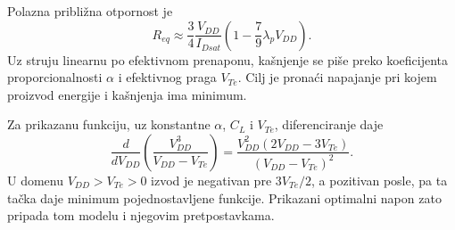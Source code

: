 Polazna približna otpornost je
\[R_{eq}\approx\frac34\frac{V_{DD}}{I_{Dsat}}\left(1-\frac79\lambda_pV_{DD}\right).\]
Uz struju linearnu po efektivnom prenaponu, kašnjenje se piše preko koeficijenta proporcionalnosti $\alpha$ i efektivnog praga $V_{Te}$. Cilj je pronaći napajanje pri kojem proizvod energije i kašnjenja ima minimum.

Za prikazanu funkciju, uz konstantne $\alpha$, $C_L$ i $V_{Te}$, diferenciranje daje
\[\frac{d}{dV_{DD}}\left(\frac{V_{DD}^3}{V_{DD}-V_{Te}}\right)=\frac{V_{DD}^2(2V_{DD}-3V_{Te})}{(V_{DD}-V_{Te})^2}.\]
U domenu $V_{DD}>V_{Te}>0$ izvod je negativan pre $3V_{Te}/2$, a pozitivan posle, pa ta tačka daje minimum pojednostavljene funkcije. Prikazani optimalni napon zato pripada tom modelu i njegovim pretpostavkama.
